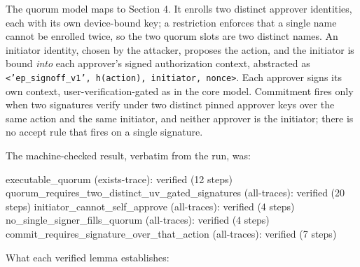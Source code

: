 \documentclass[11pt]{article}
\newcommand{\code}[1]{\texttt{#1}}
\begin{document}
The quorum model maps to Section 4. It enrolls two distinct approver identities,
each with its own device-bound key; a restriction enforces that a single name
cannot be enrolled twice, so the two quorum slots are two distinct names. An
initiator identity, chosen by the attacker, proposes the action, and the initiator
is bound \emph{into} each approver's signed authorization context, abstracted as
\code{<'ep\_signoff\_v1', h(action), initiator, nonce>}. Each approver signs its
own context, user-verification-gated as in the core model. Commitment fires only
when two signatures verify under two distinct pinned approver keys over the same
action and the same initiator, and neither approver is the initiator; there is no
accept rule that fires on a single signature.

The machine-checked result, verbatim from the run, was:

\begin{tool}
executable_quorum (exists-trace): verified (12 steps)
quorum_requires_two_distinct_uv_gated_signatures (all-traces): verified (20 steps)
initiator_cannot_self_approve (all-traces): verified (4 steps)
no_single_signer_fills_quorum (all-traces): verified (4 steps)
commit_requires_signature_over_that_action (all-traces): verified (7 steps)
\end{tool}

What each verified lemma establishes:
\end{document}
